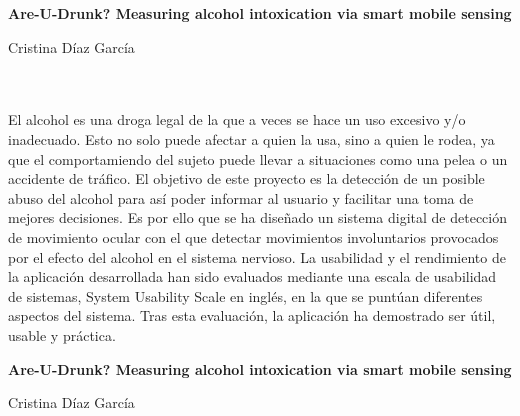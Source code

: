 
\cleardoublepage
\thispagestyle{empty}

\begin{center}
{\large\bfseries Are-U-Drunk? Measuring alcohol intoxication via smart mobile sensing}\\
\end{center}
\begin{center}
Cristina Díaz García\\
\end{center}

\\

\vspace{0.7cm}
\\

El alcohol es una droga legal de la que a veces se hace un uso excesivo y/o inadecuado. Esto no solo puede afectar a quien la usa, sino a quien le rodea, ya que el comportamiendo del sujeto puede llevar a situaciones como una pelea o un accidente de tráfico. El objetivo de este proyecto es la detección de un posible abuso del alcohol para así poder informar al usuario y facilitar una toma de mejores decisiones. Es por ello que se ha diseñado un sistema digital de detección de movimiento ocular con el que detectar movimientos involuntarios provocados por el efecto del alcohol en el sistema nervioso. La usabilidad y el rendimiento de la aplicación desarrollada han sido evaluados mediante una escala de usabilidad de sistemas, System Usability Scale en inglés, en la que se puntúan diferentes aspectos del sistema. Tras esta evaluación, la aplicación ha demostrado ser útil, usable y práctica.

\cleardoublepage


\thispagestyle{empty}


\begin{center}
{\large\bfseries Are-U-Drunk? Measuring alcohol intoxication via smart mobile sensing}\\
\end{center}
\begin{center}
Cristina Díaz García \\
\end{center}

\\

